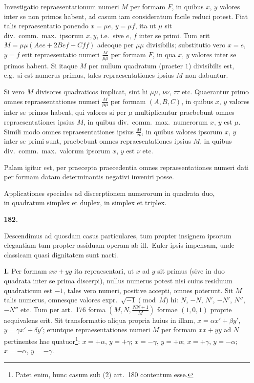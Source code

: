 \documentclass[12pt,a4paper]{article}
\theoremstyle{plain}
\begin{document}
Investigatio repraesentationum numeri $M$ per formam $F$, in quibus $x$, $y$ valores inter se non primos habent, ad casum iam consideratum facile reduci potest. Fiat talis repraesentatio ponendo $x = \mu e$, $y = \mu f$, ita ut $\mu$ sit div.~comm.~max.~ipsorum $x,y$, i.e.~sive $e$, $f$ inter se primi. Tum erit $M = \mu\mu(Aee + 2Bef + Cff)$ adeoque per $\mu\mu$ divisibilis; substitutio vero $x = e$, $y = f$ erit repraesentatio numeri $\frac{M}{\mu\mu}$ per formam $F$, in qua $x$, $y$ valores inter se primos habent. Si itaque $M$ per nullum quadratum (praeter $1$) divisibilis est, e.g.~si est numerus primus, tales repraesentationes ipsius $M$ non dabuntur.

Si vero $M$ divisores quadraticos implicat, sint hi $\mu\mu$, $\nu\nu$, $\tau\tau$ etc. Quaerantur primo omnes repraesentationes numeri $\frac{M}{\mu\mu}$ per formam $(A,B,C)$, in quibus $x$, $y$ valores inter se primos habent, qui valores si per $\mu$ multiplicantur praebebunt omnes repraesentationes ipsius $M$, in quibus div.~comm.~max.~numerorum $x$, $y$ est $\mu$. Simili modo omnes repraesentationes ipsius $\frac{M}{\nu\nu}$, in quibus valores ipsorum $x$, $y$ inter se primi sunt, praebebunt omnes repraesentationes ipsius $M$, in quibus div.~comm.~max.~valorum ipsorum $x$, $y$ est $\nu$ etc.

Palam igitur est, per praecepta praecedentia omnes repraesentationes numeri dati per formam datam determinantis negativi inveniri posse.

\bigskip

\begin{center}
\Large Applicationes speciales ad discerptionem numerorum in quadrata duo,\\
in quadratum simplex et duplex, in simplex et triplex.
\end{center}

\bigskip

\textbf{182.}

Descendimus ad quosdam casus particulares, tum propter insignem ipsorum elegantiam tum propter assiduam operam ab ill.~Euler ipsis impensam, unde classicam quasi dignitatem sunt nacti.

\textbf{I.} Per formam $xx + yy$ ita repraesentari, ut $x$ ad $y$ sit primus (sive in duo quadrata inter se prima discerpi), nullus numerus potest nisi cuius residuum quadraticum est $-1$, tales vero numeri, positive accepti, omnes poterunt. Sit $M$ talis numerus, omnesque valores expr.~$\sqrt{-1} \pmod{M}$ hi: $N$, $-N$, $N'$, $-N'$, $N''$, $-N''$ etc. Tum per art.~176 forma $(M, N, \frac{NN+1}{M})$ formae $(1,0,1)$ proprie aequivalens erit. Sit transformatio aliqua propria huius in illam, $x = \alpha x' + \beta y'$, $y = \gamma x' + \delta y'$; eruntque repraesentationes numeri $M$ per formam $xx + yy$ ad $N$ pertinentes hae quatuor\footnote{Patet enim, hunc casum sub (2) art.~180 contentum esse.}: $x = +\alpha$, $y = +\gamma$; $x = -\gamma$, $y = +\alpha$; $x = +\gamma$, $y = -\alpha$; $x = -\alpha$, $y = -\gamma$.
\end{document}

